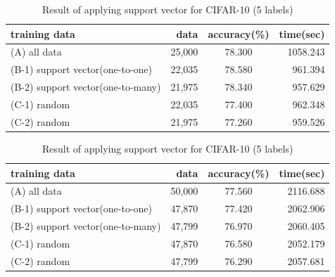 \begin{table}[b]
\begin{center}
\begin{threeparttable}
\caption{Result of applying support vector for CIFAR-10 (5 labels)}
\begin{tabular}{|l|r|c|r|} \hline
training data & data & accuracy(\%) & time(sec) \\ \hline\hline
(A) all data & 25,000 & 78.300 &1058.243 \\ \hline
(B-1) support vector(one-to-one) & 22,035 & 78.580 & 961.394 \\ \hline
(B-2) support vector(one-to-many) & 21,975 & 78.340 & 957.629 \\ \hline
(C-1) random & 22,035 & 77.400 & 962.348 \\ \hline
(C-2) random & 21,975 & 77.260 & 959.526 \\ \hline
\end{tabular}
\end{threeparttable}
\end{center}
\end{table}

\begin{table}[b]
\begin{center}
\begin{threeparttable}
\caption{Result of applying support vector for CIFAR-10 (5 labels)}
\begin{tabular}{|l|r|c|r|} \hline
training data & data & accuracy(\%) & time(sec) \\ \hline\hline
(A) all data & 50,000 & 77.560 & 2116.688 \\ \hline
(B-1) support vector(one-to-one) & 47,870 & 77.420 & 2062.906 \\ \hline
(B-2) support vector(one-to-many) & 47,799 & 76.970 & 2060.405 \\ \hline
(C-1) random & 47,870 & 76.580 & 2052.179 \\ \hline
(C-2) random & 47,799 & 76.290 & 2057.681 \\ \hline
\end{tabular}
\end{threeparttable}
\end{center}
\end{table}




